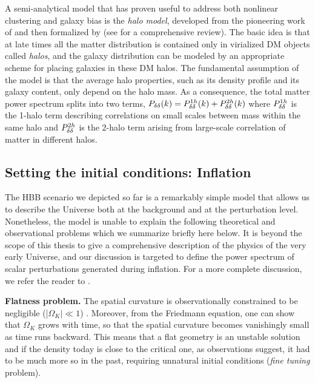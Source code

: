 A semi-analytical model that has proven useful to address both nonlinear clustering and galaxy bias is the 
\emph{halo model}, developed from the pioneering work of \citet{Neyman1952} and then formalized by 
\citet{Scherrer1991,Seljak2000}  (see \citet{Cooray2002} for a comprehensive review). The basic idea is 
that at late times all the matter distribution is contained only in virialized \gls{DM} objects called \emph
{halos}, and the galaxy distribution can be modeled by an appropriate scheme for placing galaxies in these 
\gls{DM} halos. The fundamental assumption of the model is that the average halo properties, such as 
its density profile and its galaxy content, only depend on the halo mass. As a consequence, the total 
matter power spectrum splits into two terms, $P_{\delta\delta}(k) = P_{\delta\delta}^{\rm 1h}(k)+P_{\delta\delta}^{\rm 2h}(k)$ where $P_{\delta\delta}^{\rm 1h}$ is the 1-halo term describing correlations on small 
scales between mass within the same halo and $P_{\delta\delta}^{\rm 2h}$ is the 2-halo term arising from 
large-scale correlation of matter in different halos. 


\subsection{Setting the initial conditions: Inflation}
\label{sec:inflation}
The \gls{HBB} scenario we depicted so far is a remarkably simple model that allows us to describe 
the Universe both at the background and at the perturbation level. Nonetheless, the model is unable to 
explain the following theoretical and observational problems which we summarize briefly here below. It is beyond the scope of this thesis to give a comprehensive description of the physics of the very early Universe, and our discussion is targeted to define the power spectrum of scalar perturbations generated during inflation. For a more complete discussion, we refer the reader to \cite{Mukhanov2005}.

\textbf{Flatness problem.} The spatial curvature is observationally constrained to be negligible (|$\Omega_K| 
\ll 1$) \citep{PlanckCollaboration2015b}. Moreover, from the Friedmann equation, one can show that 
$\Omega_K$ grows with time, so that the spatial curvature becomes vanishingly small as time runs 
backward. This means that a flat geometry is an unstable solution and if the density today is close to the critical 
one, as observations suggest, it had to be much more so in the past, requiring unnatural initial conditions 
(\emph{fine tuning} problem). 

